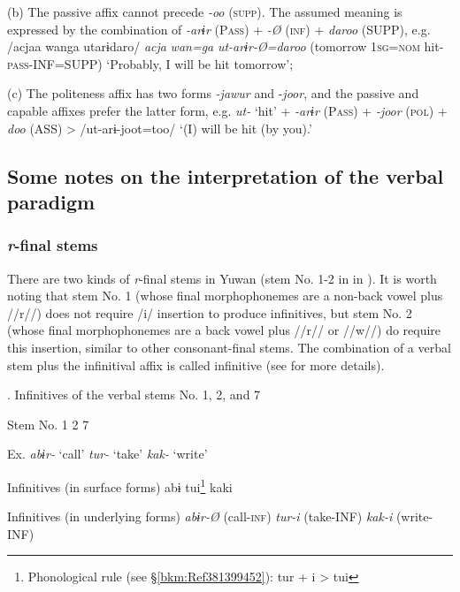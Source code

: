 (b) The passive affix cannot precede \textit{{}-oo} (\textsc{supp}). The assumed meaning is expressed by the combination of \textit{{}-arɨr} (P\textsc{ass}) + \textit{{}-Ø} (\textsc{inf}) + \textit{daroo} (SUPP), e.g. /acjaa wanga utarɨdaro/ \textit{acja} \textit{wan=ga} \textit{ut-arɨr-Ø=daroo} (tomorrow 1\textsc{sg}=\textsc{nom} hit-\textsc{pass}-INF=SUPP) ‘Probably, I will be hit tomorrow’;

(c) The politeness affix has two forms \textit{{}-jawur} and -\textit{joor}, and the passive and capable affixes prefer the latter form, e.g. \textit{ut-} ‘hit’ + \textit{{}-arɨr} (P\textsc{ass}) + \textit{{}-joor} (\textsc{pol}) + \textit{doo} (ASS) > /ut-arɨ-joot=too/ ‘(I) will be hit (by you).’

\subsection{Some notes on the interpretation of the verbal paradigm}
\subsubsection{\textit{r}{}-final stems}

There are two kinds of \textit{r}{}-final stems in Yuwan (stem No. 1-2 in  in ). It is worth noting that stem No. 1 (whose final morphophonemes are a non-back vowel plus //r//) does not require /i/ insertion to produce infinitives, but stem No. 2 (whose final morphophonemes are a back vowel plus //r// or //w//) do require this insertion, similar to other consonant-final stems. The combination of a verbal stem plus the infinitival affix is called infinitive (see  for more details).

\begin{styleBeschriftung}
\textmd{}\textmd{. Infinitives of the verbal stems No. 1, 2, and 7}
\end{styleBeschriftung}

Stem No.  1    2    7

Ex.  \textit{abɨr-} ‘call’    \textit{tur-} ‘take’    \textit{kak-} ‘write’

Infinitives (in surface forms)  abɨ      tui\footnote{Phonological rule (see §\ref{bkm:Ref381399452}): tur + i > tui}      kaki  

Infinitives (in underlying forms)  \textit{abɨr-Ø}  (call-\textsc{inf})    \textit{tur-i}  (take-INF)    \textit{kak-i}  (write-INF)


